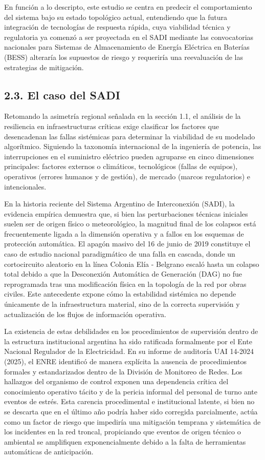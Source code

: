 En función a lo descripto, este estudio se centra en predecir el comportamiento del sistema bajo su estado topológico actual, entendiendo que la futura integración de tecnologías de respuesta rápida, cuya viabilidad técnica y regulatoria ya comenzó a ser proyectada en el SADI mediante las convocatorias nacionales para Sistemas de Almacenamiento de Energía Eléctrica en Baterías (BESS) alteraría los supuestos de riesgo y requeriría una reevaluación de las estrategias de mitigación.

\hypertarget{el-caso-del-sadi}{%
\subsection{2.3. El caso del SADI}\label{el-caso-del-sadi}}

Retomando la asimetría regional señalada en la sección 1.1, el análisis de la resiliencia en infraestructuras críticas exige clasificar los factores que desencadenan las fallas sistémicas para determinar la viabilidad de su modelado algorítmico. Siguiendo la taxonomía internacional de la ingeniería de potencia, las interrupciones en el suministro eléctrico pueden agruparse en cinco dimensiones principales: factores externos o climáticos, tecnológicos (fallas de equipos), operativos (errores humanos y de gestión), de mercado (marcos regulatorios) e intencionales.

En la historia reciente del Sistema Argentino de Interconexión (SADI), la evidencia empírica demuestra que, si bien las perturbaciones técnicas iniciales suelen ser de origen físico o meteorológico, la magnitud final de los colapsos está frecuentemente ligada a la dimensión operativa y a fallos en los esquemas de protección automática. El apagón masivo del 16 de junio de 2019 constituye el caso de estudio nacional paradigmático de una falla en cascada, donde un cortocircuito aleatorio en la línea Colonia Elía - Belgrano escaló hasta un colapso total debido a que la Desconexión Automática de Generación (DAG) no fue reprogramada tras una modificación física en la topología de la red por obras civiles. Este antecedente expone cómo la estabilidad sistémica no depende únicamente de la infraestructura material, sino de la correcta supervisión y actualización de los flujos de información operativa.

La existencia de estas debilidades en los procedimientos de supervisión dentro de la estructura institucional argentina ha sido ratificada formalmente por el Ente Nacional Regulador de la Electricidad. En su informe de auditoría UAI 14-2024 (2025), el ENRE identificó de manera explícita la ausencia de procedimientos formales y estandarizados dentro de la División de Monitoreo de Redes. Los hallazgos del organismo de control exponen una dependencia crítica del conocimiento operativo tácito y de la pericia informal del personal de turno ante eventos de estrés. Esta carencia procedimental e institucional latente, si bien no se descarta que en el último año podría haber sido corregida parcialmente, actúa como un factor de riesgo que impediría una mitigación temprana y sistemática de los incidentes en la red troncal, propiciando que eventos de origen técnico o ambiental se amplifiquen exponencialmente debido a la falta de herramientas automáticas de anticipación.

